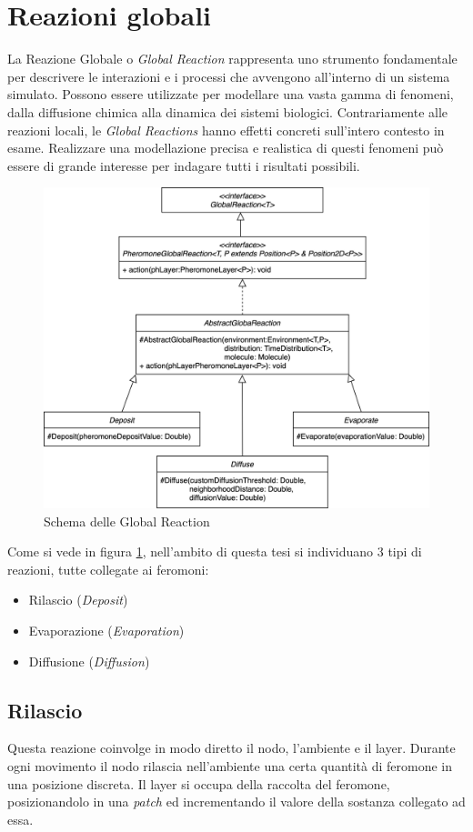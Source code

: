 \section{Reazioni globali}
La Reazione Globale o \textit{Global Reaction} rappresenta uno strumento fondamentale per descrivere
le interazioni e i processi che avvengono all'interno di un sistema simulato.
Possono essere utilizzate per modellare una vasta gamma di fenomeni, dalla diffusione chimica alla dinamica dei sistemi biologici.
Contrariamente alle reazioni locali, le \textit{Global Reactions} hanno effetti concreti sull'intero contesto in esame. 
Realizzare una modellazione precisa e realistica di questi fenomeni può essere di grande interesse per indagare tutti i risultati possibili.
\begin{figure}[ht]
    \centering
    \includegraphics[width=.7\linewidth]{figures/global.png}
    \caption{Schema delle Global Reaction }\label{fig:global}
\end{figure}\newline
Come si vede in figura \cref{fig:global}, nell'ambito di questa tesi si individuano 3 tipi di reazioni, tutte collegate ai feromoni:
\begin{itemize}
    \item Rilascio (\textit{Deposit})
    \item Evaporazione (\textit{Evaporation})
    \item Diffusione (\textit{Diffusion})
\end{itemize}
\subsection{Rilascio}
Questa reazione coinvolge in modo diretto il nodo, l'ambiente e il layer. Durante ogni movimento il nodo rilascia 
nell'ambiente una certa quantità di feromone in una posizione discreta. Il layer si occupa della raccolta del feromone,
posizionandolo in una \textit{patch} ed incrementando il valore della sostanza collegato ad essa.
